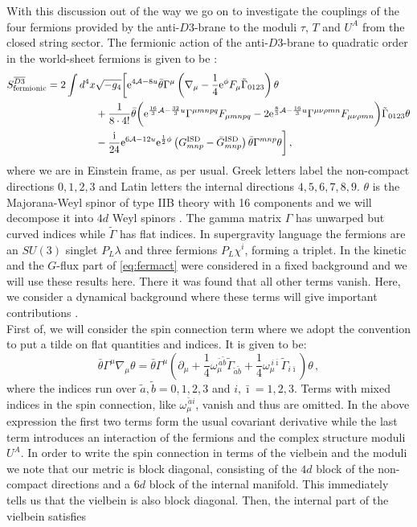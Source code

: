 \documentclass[12pt]{report}
\newcommand{\be}{\begin{equation}}
\newcommand{\ee}{\end{equation}}
\newcommand{\bea}{\begin{equation}\begin{aligned}}
\newcommand{\eea}{\end{aligned}\end{equation}}
\def\rmi{{\rm i}}
\def\rme{{\rm e}}
\def\ib{{\bar \imath}}
\begin{document}
With this discussion out of the way we go on to investigate the couplings of the four fermions provided by the anti-$D3$-brane to the moduli $\tau$, $T$ and $U^A$ from the closed string sector. The fermionic action of the anti-$D3$-brane \cite{Bergshoeff:2015jxa,GarciadelMoral:2017vnz,Grana:2002tu,McGuirk:2012sb} to quadratic order in the world-sheet fermions is given to be \cite{Bergshoeff:2015jxa,Martucci:2005rb,Bergshoeff:2005yp}:
\bea 
S_{\text{fermionic}}^{\overline{D3}} = 2 \int d^4x & \sqrt{-g_4} \bigg[ \rme^{4\mathcal{A} - 8u} \bar{\theta}\Gamma^\mu \left( \nabla_\mu - \frac{1}{4} \rme^\phi F_\mu \tilde{\Gamma}_{0123}\right)\theta\\
&+ \frac{1}{8\cdot 4!} \bar{\theta} \bigg(\rme^{\frac{16}{3} \mathcal{A} - \frac{32}{3} u} \Gamma^{\mu mnpq}F_{\mu mnpq} - 2 \rme^{\frac{8}{3} \mathcal{A} - \frac{16}{3} u} \Gamma^{\mu\nu\rho mn} F_{\mu\nu\rho mn}\bigg) \tilde{\Gamma}_{0123}\theta\\
&- \frac{\rmi}{24} \rme^{6\mathcal{A} - 12u} \rme^{\frac{1}{2} \phi} \left( G_{mnp}^{\text{ISD}} - \bar{G}_{mnp}^{\text{ISD}}\right) \bar{\theta} \Gamma^{mnp} \theta \bigg]\,,
\label{eq:fermact}
\eea
where we are in Einstein frame, as per usual. Greek letters label the non-compact directions $0,1,2,3$ and Latin letters the internal directions $4,5,6,7,8,9$. $\theta$ is the Majorana-Weyl spinor of type IIB theory with 16 components and we will decompose it into $4d$ Weyl spinors \cite{Bergshoeff:2015jxa,Grana:2002tu}. The gamma matrix $\Gamma$ has unwarped but curved indices while $\tilde{\Gamma}$ has flat indices. In supergravity language \cite{Freedman:2012zz} the fermions are an $SU(3)$ singlet $P_L\lambda$ and three fermions $P_L\chi^i$, forming a triplet. In \cite{Bergshoeff:2015jxa} the kinetic and the $G$-flux part of \eqref{eq:fermact} were considered in a fixed background and we will use these results here. There it was found that all other terms vanish. Here, we consider a dynamical background where these terms will give important contributions \cite{Cribiori:2019hod}.\\
First of, we will consider the spin connection term where we adopt the convention to put a tilde on flat quantities and indices. It is given to be:
\be
\bar{\theta} \Gamma^\mu \nabla_\mu \theta = \bar{\theta} \Gamma^\mu \left(\partial_\mu + \frac{1}{4} \omega_\mu^{\,\tilde{a}\tilde{b}} \tilde{\Gamma}_{\tilde{a}\tilde{b}} + \frac{1}{4} \omega_\mu^{\,i\ib} \tilde{\Gamma}_{i\ib}\right) \theta\,,
\ee
where the indices run over $\tilde{a},\tilde{b} = 0,1,2,3$ and $i,\ib=1,2,3$. Terms with mixed indices in the spin connection, like $\omega_\mu^{\,\tilde{a}i}$, vanish and thus are omitted. In the above expression the first two terms form the usual covariant derivative while the last term introduces an interaction of the fermions and the complex structure moduli $U^A$. In order to write the spin connection in terms of the vielbein and the moduli we note that our metric is block diagonal, consisting of the $4d$ block of the non-compact directions and a $6d$ block of the internal manifold. This immediately tells us that the vielbein is also block diagonal. Then, the internal part of the vielbein satisfies
\end{document}
